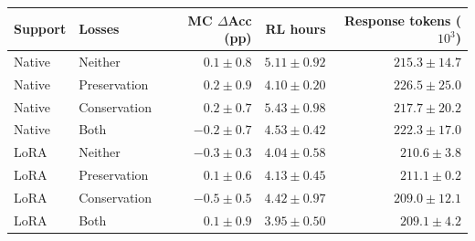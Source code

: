 \begin{tabular}{@{}llrrr@{}}
\toprule
Support & Losses & MC $\Delta$Acc (pp) & RL hours & Response tokens ($10^3$)\\
\midrule
Native & Neither & $0.1 \pm 0.8$ & $5.11 \pm 0.92$ & $215.3 \pm 14.7$\\
Native & Preservation & $0.2 \pm 0.9$ & $4.10 \pm 0.20$ & $226.5 \pm 25.0$\\
Native & Conservation & $0.2 \pm 0.7$ & $5.43 \pm 0.98$ & $217.7 \pm 20.2$\\
Native & Both & $-0.2 \pm 0.7$ & $4.53 \pm 0.42$ & $222.3 \pm 17.0$\\
LoRA & Neither & $-0.3 \pm 0.3$ & $4.04 \pm 0.58$ & $210.6 \pm 3.8$\\
LoRA & Preservation & $0.1 \pm 0.6$ & $4.13 \pm 0.45$ & $211.1 \pm 0.2$\\
LoRA & Conservation & $-0.5 \pm 0.5$ & $4.42 \pm 0.97$ & $209.0 \pm 12.1$\\
LoRA & Both & $0.1 \pm 0.9$ & $3.95 \pm 0.50$ & $209.1 \pm 4.2$\\
\bottomrule
\end{tabular}
